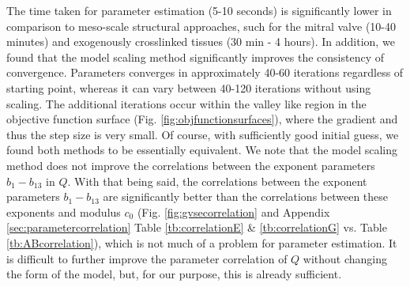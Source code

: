     The time taken for parameter estimation (5-10 seconds) is significantly lower in comparison to meso-scale structural approaches, such for the mitral valve \cite{zhang_meso_2016} (10-40 minutes) and exogenously crosslinked tissues \cite{zhang_modeling_2017}(30 min - 4 hours). In addition, we found that the model scaling method significantly improves the consistency of convergence. Parameters converges in approximately 40-60 iterations regardless of starting point, whereas it can vary between 40-120 iterations without using scaling. The additional iterations occur within the valley like region in the objective function surface (Fig. \ref{fig:objfunctionsurfaces}), where the gradient and thus the step size is very small. Of course, with sufficiently good initial guess, we found both methods to be essentially equivalent. We note that the model scaling method does not improve the correlations between the exponent parameters $b_1-b_{13}$ in $Q$. With that being said, the correlations between the exponent parameters $b_1-b_{13}$ are significantly better than the correlations between these exponents and modulus $c_0$ (Fig. \ref{fig:gvsecorrelation} and Appendix \ref{sec:parametercorrelation} Table \ref{tb:correlationE} \& \ref{tb:correlationG} vs. Table \ref{tb:ABcorrelation}), which is not much of a problem for parameter estimation. It is difficult to further improve the parameter correlation of $Q$ without changing the form of the model, but, for our purpose, this is already sufficient. 
    
